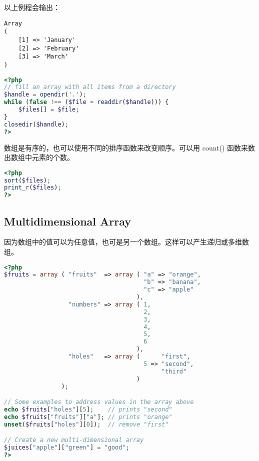 以上例程会输出：


\begin{verbatim}
Array 
(
    [1] => 'January'
    [2] => 'February'
    [3] => 'March'
)
\end{verbatim}




\begin{lstlisting}[language=PHP]
<?php
// fill an array with all items from a directory
$handle = opendir('.');
while (false !== ($file = readdir($handle))) {
    $files[] = $file;
}
closedir($handle); 
?>
\end{lstlisting}

数组是有序的，也可以使用不同的排序函数来改变顺序。可以用 count() 函数来数出数组中元素的个数。

\begin{lstlisting}[language=PHP]
<?php
sort($files);
print_r($files);
?>
\end{lstlisting}

\subsection{Multidimensional Array}


因为数组中的值可以为任意值，也可是另一个数组。这样可以产生递归或多维数组。



\begin{lstlisting}[language=PHP]
<?php
$fruits = array ( "fruits"  => array ( "a" => "orange",
                                       "b" => "banana",
                                       "c" => "apple"
                                     ),
                  "numbers" => array ( 1,
                                       2,
                                       3,
                                       4,
                                       5,
                                       6
                                     ),
                  "holes"   => array (      "first",
                                       5 => "second",
                                            "third"
                                     )
                );

// Some examples to address values in the array above 
echo $fruits["holes"][5];    // prints "second"
echo $fruits["fruits"]["a"]; // prints "orange"
unset($fruits["holes"][0]);  // remove "first"

// Create a new multi-dimensional array
$juices["apple"]["green"] = "good"; 
?>
\end{lstlisting}


